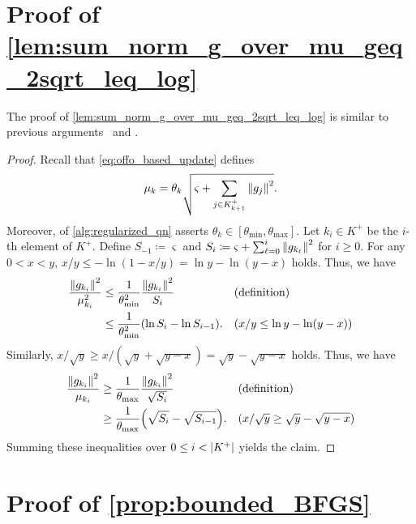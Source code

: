 \section{Proof of \texorpdfstring{\cref{lem:sum_norm_g_over_mu_geq_2sqrt_leq_log}}{Lemma \ref{lem:sum_norm_g_over_mu_geq_2sqrt_leq_log}}}\label{sec:proof_of_sum_norm_g_over_mu_geq_2sqrt_leq_log}

The proof of \cref{lem:sum_norm_g_over_mu_geq_2sqrt_leq_log} is similar to previous arguments~\citep[Lemma~3.2]{wardAdaGradStepsizesSharp2020} and \citep[Lemma~3.1]{Gratton08022024}.
\begin{proof}
    Recall that \cref{eq:offo_based_update} defines
    \begin{equation*}
        \mu_k=\theta_k \sqrt{\varsigma + \sum_{j \in K^+_{k+1}} \norm{g_j}^2}.
    \end{equation*}
    Moreover,  of \cref{alg:regularized_qn} asserts $\theta_k \in [\theta_{\min}, \theta_{\max}]$.
    Let $k_i \in K^+$ be the $i$-th element of $K^+$.
    Define $S_{-1} \coloneqq \varsigma$ and $S_i \coloneqq \varsigma + \sum_{\ell=0}^{i} \norm{g_{k_\ell}}^2$ for $i \geq 0$.
    For any $0 < x < y$, $x/y \le -\ln(1-x/y) = \ln y - \ln(y-x)$ holds.
    Thus, we have
    \begin{align*}
        \frac{\norm{g_{k_i}}^2}{\mu_{k_i}^2}
         & \leq \frac{1}{\theta_{\min}^2} \frac{\norm{g_{k_i}}^2}{S_i} &  & (\text{definition}) \\
         & \leq \frac{1}{\theta_{\min}^2} \qty(\ln S_i - \ln S_{i-1}).  &  & (x/y \leq \ln y - \ln(y-x))
    \end{align*}
    Similarly, $x/\sqrt{y} \ge x/(\sqrt{y}+\sqrt{y-x}) = \sqrt{y}-\sqrt{y-x}$ holds.
    Thus, we have
    \begin{align*}
        \frac{\norm{g_{k_i}}^2}{\mu_{k_i}}
         & \geq \frac{1}{\theta_{\max}} \frac{\norm{g_{k_i}}^2}{\sqrt{S_i}} &  & (\text{definition}) \\
         & \geq \frac{1}{\theta_{\max}} \qty(\sqrt{S_i} - \sqrt{S_{i-1}}). &  & (x/\sqrt{y} \geq \sqrt{y} - \sqrt{y-x})
    \end{align*}
    Summing these inequalities over $0 \le i < \abs{K^+}$ yields the claim.
    \myQED
\end{proof}

\section{Proof of \texorpdfstring{\cref{prop:bounded_BFGS}}{Proposition \ref{prop:bounded_BFGS}}}\label{app:proof_of_bounded_BFGS}

